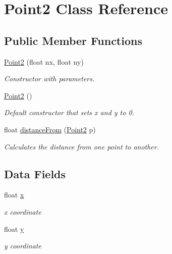 \hypertarget{class_point2}{}\section{Point2 Class Reference}
\label{class_point2}
\subsection*{Public Member Functions}
\begin{DoxyCompactItemize}
\item 
\mbox{\hyperlink{class_point2_aacbc4e0dd668e79bb7b830dde3cb1f9b}{Point2}} (float nx, float ny)
\begin{DoxyCompactList}\small\item\em Constructor with parameters. \end{DoxyCompactList}\item 
\mbox{\hyperlink{class_point2_a8d40ddb5c8e0ce8e26b725f37782e08b}{Point2}} ()
\begin{DoxyCompactList}\small\item\em Default constructor that sets x and y to 0. \end{DoxyCompactList}\item 
float \mbox{\hyperlink{class_point2_a39034c003b58aa1a4555445059b0ee47}{distance\+From}} (\mbox{\hyperlink{class_point2}{Point2}} p)
\begin{DoxyCompactList}\small\item\em Calculates the distance from one point to another. \end{DoxyCompactList}\end{DoxyCompactItemize}
\subsection*{Data Fields}
\begin{DoxyCompactItemize}
\item 
float \mbox{\hyperlink{class_point2_a230f49d24800fd2682c9c96a7156057a}{x}}
\begin{DoxyCompactList}\small\item\em x coordinate \end{DoxyCompactList}\item 
float \mbox{\hyperlink{class_point2_a72a62f27138bc247e86cddb3dfc7c6b2}{y}}
\begin{DoxyCompactList}\small\item\em y coordinate \end{DoxyCompactList}\end{DoxyCompactItemize}
